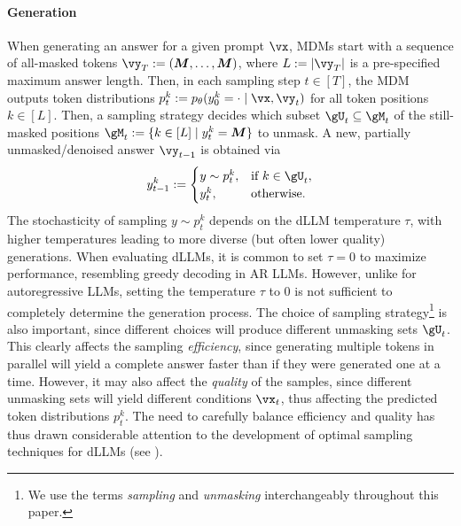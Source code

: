 \paragraph{Generation} When generating an answer for a given prompt $\vx$, MDMs start with a sequence of all-masked tokens $\vy_T := (\mask, \ldots, \mask)$, where $L :=  |\vy_T|$ is a pre-specified maximum answer length. Then, in each sampling step $t \in [T]$, the MDM outputs token distributions $p_{t}^k := p_{\theta}(y_0^k = \cdot \mid \vx, \vy_{t})$ for all token positions $k \in [L]$. Then, a sampling strategy decides which subset $\gU_t \subseteq \gM_{t}$ of the still-masked positions $\gM_{t} := \{k \in [L] \mid y_{t}^k = \mask\}$ to unmask. A new, partially unmasked/denoised answer $\vy_{t-1}$ is obtained via 
\begin{align}
\label{eq:mdm_sampling}
    y_{t-1}^k := \begin{cases}
        y \sim p_{t}^k, & \text{if } k \in \gU_t, \\
        y_{t}^k, & \text{otherwise.}
    \end{cases} 
\end{align}
The stochasticity of sampling $y \sim p_{t}^k$ depends on the dLLM temperature $\tau$, with higher temperatures leading to more diverse (but often lower quality) generations.
When evaluating dLLMs, it is common to set $\tau=0$ \citep{llada2025, fastdllm2025} to maximize performance, resembling greedy decoding in AR LLMs.
However, unlike for autoregressive LLMs, setting the temperature $\tau$ to 0 is not sufficient to completely determine the generation process.
The choice of sampling strategy\footnote{We use the terms \emph{sampling} and \emph{unmasking} interchangeably throughout this paper.} is also important, since different choices will produce different unmasking sets $\gU_t$.
This clearly affects the sampling \emph{efficiency}, since generating multiple tokens in parallel will yield a complete answer faster than if they were generated one at a time.
However, it may also affect the \emph{quality} of the samples, since different unmasking sets will yield different conditions $\vx_t$, thus affecting the predicted token distributions $p_t^k$.
The need to carefully balance efficiency and quality has thus drawn considerable attention to the development of optimal sampling techniques for dLLMs (see ). %


